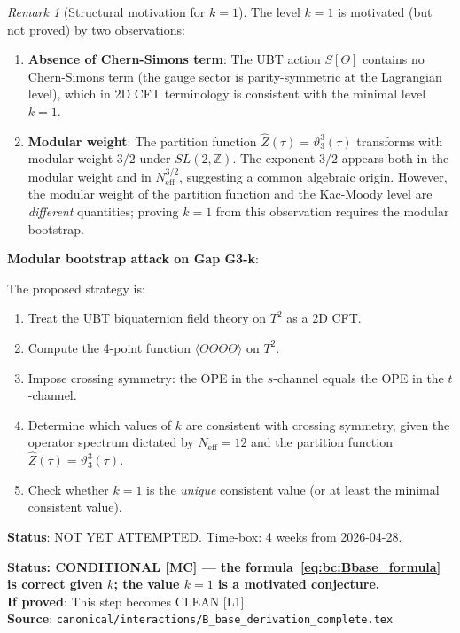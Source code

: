 \documentclass[12pt,a4paper]{article}
\theoremstyle{definition}
\theoremstyle{remark}
\newtheorem{remark}[theorem]{Remark}
\begin{document}
\begin{remark}[Structural motivation for $k = 1$]
\label{rem:bc:k_motivation}
The level $k = 1$ is motivated (but not proved) by two observations:
\begin{enumerate}
  \item \textbf{Absence of Chern-Simons term}: The UBT action $S[\Theta]$ contains
        no Chern-Simons term (the gauge sector is parity-symmetric at the Lagrangian
        level), which in 2D CFT terminology is consistent with the minimal level $k=1$.
  \item \textbf{Modular weight}: The partition function $\hat{Z}(\tau) = \vartheta_3^3(\tau)$
        transforms with modular weight $3/2$ under $SL(2,\mathbb{Z})$.  The exponent
        $3/2$ appears both in the modular weight and in $N_{\mathrm{eff}}^{3/2}$,
        suggesting a common algebraic origin.  However, the modular weight of the
        partition function and the Kac-Moody level are \emph{different} quantities;
        proving $k = 1$ from this observation requires the modular bootstrap.
\end{enumerate}
\end{remark}

\begin{insightbox}
\textbf{Modular bootstrap attack on Gap G3-k}:

The proposed strategy is:
\begin{enumerate}
  \item Treat the UBT biquaternion field theory on $T^2$ as a 2D CFT.
  \item Compute the 4-point function $\langle\Theta\Theta\Theta\Theta\rangle$ on $T^2$.
  \item Impose crossing symmetry: the OPE in the $s$-channel equals the OPE in
        the $t$-channel.
  \item Determine which values of $k$ are consistent with crossing symmetry, given
        the operator spectrum dictated by $N_{\mathrm{eff}} = 12$ and the partition
        function $\hat{Z}(\tau) = \vartheta_3^3(\tau)$.
  \item Check whether $k = 1$ is the \emph{unique} consistent value (or at least
        the minimal consistent value).
\end{enumerate}
\textbf{Status}: NOT YET ATTEMPTED.  Time-box: 4 weeks from 2026-04-28.
\end{insightbox}

\begin{resultbox}
\textbf{Status: CONDITIONAL [MC] — the formula~\eqref{eq:bc:Bbase_formula} is
correct given $k$; the value $k = 1$ is a motivated conjecture.}\\
\textbf{If proved}: This step becomes CLEAN [L1].\\
\textbf{Source}: \texttt{canonical/interactions/B\_base\_derivation\_complete.tex}
\end{resultbox}
\end{document}
